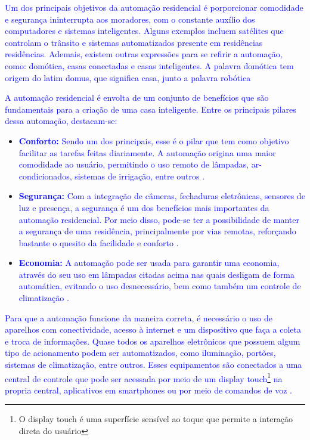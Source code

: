     \textcolor{blue}{Um dos principais objetivos da automação residencial é porporcionar comodidade e segurança ininterrupta aos moradores, com o constante auxílio dos computadores e sistemas inteligentes. Alguns exemplos incluem satélites que controlam o trânsito e sistemas automatizados presente em residências residências\cite{algunsAspectos}. Ademais, existem outras expressões para se refirir a automação, como: domótica, casas conectadas e casas inteligentes. A palavra domótica tem origem do latim domus, que significa casa, junto a palavra robótica \cite{automacaoTecnologiaPraticidade}}

    \textcolor{blue}{A automação residencial é envolta de um conjunto de benefícios que são fundamentais para a criação de uma casa inteligente. Entre os principais pilares dessa automação, destacam-se:}

    \begin{itemize}
        \item \textbf{\textcolor{blue}{Conforto:}} \textcolor{blue}{Sendo um dos principais, esse é o pilar que tem como objetivo facilitar as tarefas feitas diariamente. A automação origina uma maior comodidade ao usuário, permitindo o uso remoto de lâmpadas, ar-condicionados, sistemas de irrigação, entre outros \cite{automacaoTecnologiaPraticidade}.}
        
        \item \textbf{\textcolor{blue}{Segurança:}} \textcolor{blue}{Com a integração de câmeras, fechaduras eletrônicas, sensores de luz e presença, a segurança é um dos benefícios mais importantes da automação residencial. Por meio disso, pode-se ter a possibilidade de manter a segurança de uma residência, principalmente por vias remotas, reforçando bastante o quesito da facilidade e conforto \cite{automacaoTecnologiaPraticidade}.}
        
        \item \textbf{\textcolor{blue}{Economia:}} \textcolor{blue}{A automação pode ser usada para garantir uma economia, através do seu uso em lâmpadas citadas acima nas quais desligam de forma automática, evitando o uso desnecessário, bem como também um controle de climatização \cite{automacaoTecnologiaPraticidade}.}
        
    \end{itemize}

    \textcolor{blue}{Para que a automação funcione da maneira correta, é necessário o uso de aparelhos com conectividade, acesso à internet e um dispositivo que faça a coleta e troca de informações. Quase todos os aparelhos eletrônicos que possuem algum tipo de acionamento podem ser automatizados, como iluminação, portões, sistemas de climatização, entre outros. Esses equipamentos são conectados a uma central de controle que pode ser acessada por meio de um display touch\footnote{O display touch é uma superfície sensível ao toque que permite a interação direta do usuário} na propria central, aplicativos em smartphones ou por meio de comandos de voz \cite{automacaoTecnologiaPraticidade}.}

